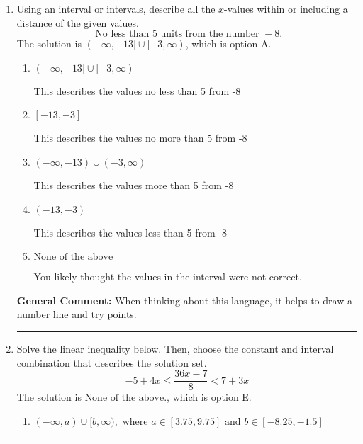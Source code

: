 \documentclass{extbook}[14pt]
\newcommand{\litem}[1]{\item #1

\rule{\textwidth}{0.4pt}}
\begin{document}
\begin{enumerate}
{\begin{enumerate}[label=\Alph*.]
* $[-29.0, \infty)$, which is the correct option.
\item \( [a, \infty), \text{ where } a \in [24.75, 30.75] \)

 $[29.0, \infty)$, which corresponds to negating the endpoint of the solution.
\item \( \text{None of the above}. \)

You may have chosen this if you thought the inequality did not match the ends of the intervals.
\end{enumerate}

\textbf{General Comment:} Remember that less/greater than or equal to includes the endpoint, while less/greater do not. Also, remember that you need to flip the inequality when you multiply or divide by a negative.
}
\litem{
Using an interval or intervals, describe all the $x$-values within or including a distance of the given values.
\[ \text{ No less than } 5 \text{ units from the number } -8. \]The solution is \( (-\infty, -13] \cup [-3, \infty) \), which is option A.\begin{enumerate}[label=\Alph*.]
\item \( (-\infty, -13] \cup [-3, \infty) \)

This describes the values no less than 5 from -8
\item \( [-13, -3] \)

This describes the values no more than 5 from -8
\item \( (-\infty, -13) \cup (-3, \infty) \)

This describes the values more than 5 from -8
\item \( (-13, -3) \)

This describes the values less than 5 from -8
\item \( \text{None of the above} \)

You likely thought the values in the interval were not correct.
\end{enumerate}

\textbf{General Comment:} When thinking about this language, it helps to draw a number line and try points.
}
\litem{
Solve the linear inequality below. Then, choose the constant and interval combination that describes the solution set.
\[ -5 + 4 x \leq \frac{36 x - 7}{8} < 7 + 3 x \]The solution is \( \text{None of the above.} \), which is option E.\begin{enumerate}[label=\Alph*.]
\item \( (-\infty, a) \cup [b, \infty), \text{ where } a \in [3.75, 9.75] \text{ and } b \in [-8.25, -1.5] \)


\end{enumerate}}
\end{enumerate}
\end{document}
